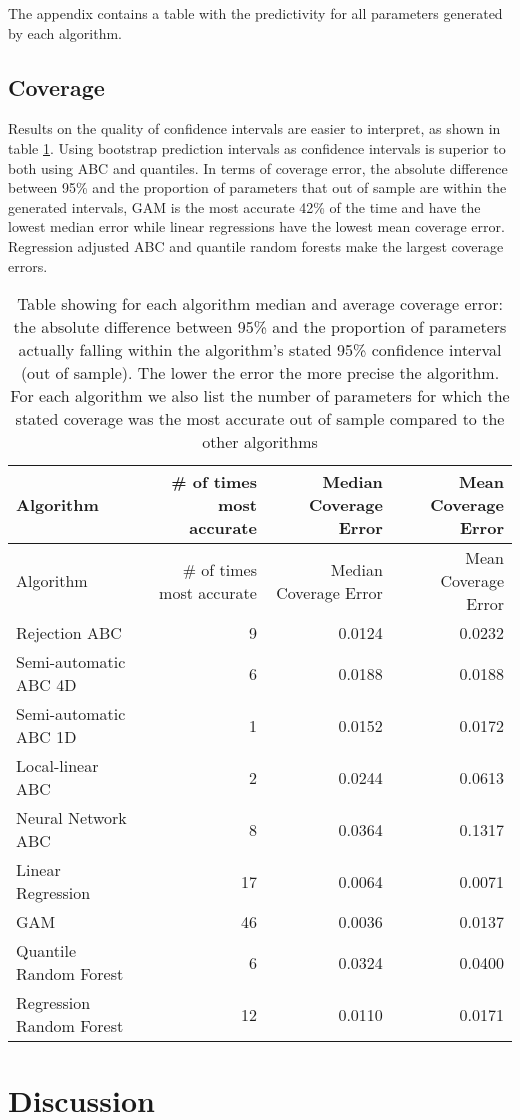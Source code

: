 \documentclass[]{article}
\begin{document}
The appendix contains a table with the predictivity for all parameters generated by each algorithm.

\hypertarget{coverage}{%
\subsection{Coverage}\label{coverage}}

Results on the quality of confidence intervals are easier to interpret, as shown in table \ref{tab:coveragetable}.
Using bootstrap prediction intervals as confidence intervals is superior to both using ABC and quantiles.
In terms of coverage error, the absolute difference between 95\% and the proportion of parameters that out of sample are within the generated intervals, GAM is the most accurate 42\% of the time and have the lowest median error while linear regressions have the lowest mean coverage error.
Regression adjusted ABC and quantile random forests make the largest coverage errors.

\begin{longtable}[]{@{}lrrr@{}}
\caption{\label{tab:coveragetable}Table showing for each algorithm median and average coverage error: the absolute difference between 95\% and the proportion of parameters actually falling within the algorithm's stated 95\% confidence interval (out of sample). The lower the error the more precise the algorithm. For each algorithm we also list the number of parameters for which the stated coverage was the most accurate out of sample compared to the other algorithms}\tabularnewline
\toprule
Algorithm & \# of times most accurate & Median Coverage Error & Mean Coverage Error\tabularnewline
\midrule
\endfirsthead
\toprule
Algorithm & \# of times most accurate & Median Coverage Error & Mean Coverage Error\tabularnewline
\midrule
\endhead
Rejection ABC & 9 & 0.0124 & 0.0232\tabularnewline
Semi-automatic ABC 4D & 6 & 0.0188 & 0.0188\tabularnewline
Semi-automatic ABC 1D & 1 & 0.0152 & 0.0172\tabularnewline
Local-linear ABC & 2 & 0.0244 & 0.0613\tabularnewline
Neural Network ABC & 8 & 0.0364 & 0.1317\tabularnewline
Linear Regression & 17 & 0.0064 & 0.0071\tabularnewline
GAM & 46 & 0.0036 & 0.0137\tabularnewline
Quantile Random Forest & 6 & 0.0324 & 0.0400\tabularnewline
Regression Random Forest & 12 & 0.0110 & 0.0171\tabularnewline
\bottomrule
\end{longtable}

\hypertarget{discussion}{%
\section{Discussion}\label{discussion}}
\end{document}
